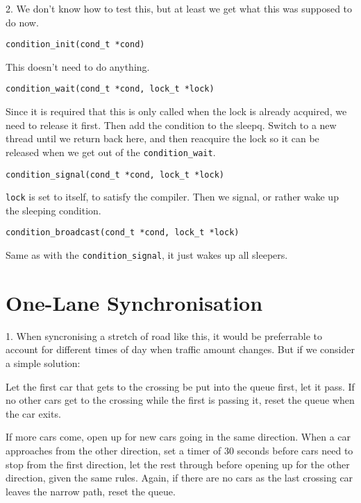 \vspace{1pc}

2. We don't know how to test this, but at least we get what this was
supposed to do now.

\vspace{0.5pc}

\verb+condition_init(cond_t *cond)+

This doesn't need to do anything.

\vspace{0.5pc}

\verb+condition_wait(cond_t *cond, lock_t *lock)+

Since it is required that this is only called when the lock is already
acquired, we need to release it first. Then add the condition to the
sleepq. Switch to a new thread until we return back here, and then
reacquire the lock so it can be released when we get out of the
\verb+condition_wait+.

\vspace{0.5pc}

\verb+condition_signal(cond_t *cond, lock_t *lock)+

\verb+lock+ is set to itself, to satisfy the compiler. Then we signal,
or rather wake up the sleeping condition.

\vspace{0.5pc}

\verb+condition_broadcast(cond_t *cond, lock_t *lock)+

Same as with the \verb+condition_signal+, it just wakes up all sleepers.


\section{One-Lane Synchronisation}

1. When syncronising a stretch of road like this, it would be
preferrable to account for different times of day when traffic amount
changes. But if we consider a simple solution:

Let the first car that gets to the crossing be put into the queue
first, let it pass. If no other cars get to the crossing while the
first is passing it, reset the queue when the car exits.

If more cars come, open up for new cars going in the same
direction. When a car approaches from the other direction, set a timer
of 30 seconds before cars need to stop from the first direction, let
the rest through before opening up for the other direction, given the
same rules. Again, if there are no cars as the last crossing car
leaves the narrow path, reset the queue.

